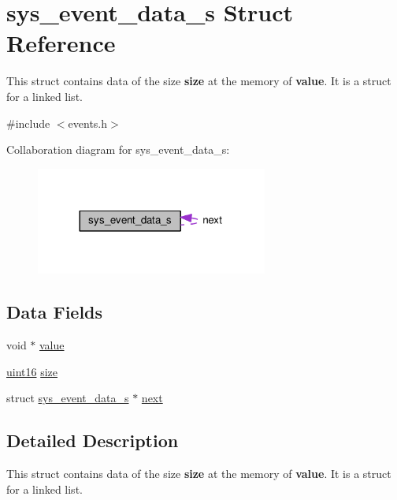 \hypertarget{structsys__event__data__s}{}\section{sys\+\_\+event\+\_\+data\+\_\+s Struct Reference}
\label{structsys__event__data__s}


This struct contains data of the size {\bfseries size} at the memory of {\bfseries value}. It is a struct for a linked list.  




{\ttfamily \#include $<$events.\+h$>$}



Collaboration diagram for sys\+\_\+event\+\_\+data\+\_\+s\+:\nopagebreak
\begin{figure}[H]
\begin{center}
\leavevmode
\includegraphics[width=216pt]{df/d2a/structsys__event__data__s__coll__graph}
\end{center}
\end{figure}
\subsection*{Data Fields}
\begin{DoxyCompactItemize}
\item 
void $\ast$ \hyperlink{structsys__event__data__s_a72c5ebbbee4b4509abcfb926d23f294f}{value}
\item 
\hyperlink{definitions_8h_a05f6b0ae8f6a6e135b0e290c25fe0e4e}{uint16} \hyperlink{structsys__event__data__s_a61e4846d66a617a9e5ed3602a3be63ef}{size}
\item 
struct \hyperlink{structsys__event__data__s}{sys\+\_\+event\+\_\+data\+\_\+s} $\ast$ \hyperlink{structsys__event__data__s_aa6f72c940fd46fc646876fe4271040a8}{next}
\end{DoxyCompactItemize}


\subsection{Detailed Description}
This struct contains data of the size {\bfseries size} at the memory of {\bfseries value}. It is a struct for a linked list. 

